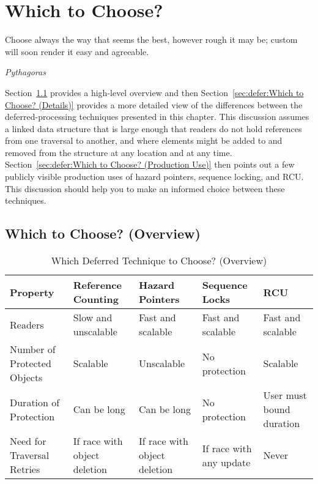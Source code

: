 
\section{Which to Choose?}
\label{sec:defer:Which to Choose?}
%
\epigraph{Choose always the way that seems the best, however rough it
	  may be; custom will soon render it easy and agreeable.}
	  {\emph{Pythagoras}}

Section~\ref{sec:defer:Which to Choose? (Overview)}
provides a high-level overview and then
Section~\ref{sec:defer:Which to Choose? (Details)}
provides a more detailed view
of the differences between the deferred-processing techniques presented
in this chapter.
This discussion assumes a linked data structure that is large enough
that readers do not hold references from one traversal to another,
and where elements might be added to and removed from the structure
at any location and at any time.
Section~\ref{sec:defer:Which to Choose? (Production Use)}
then points out a few publicly visible production uses of
hazard pointers, sequence locking, and RCU\@.
This discussion should help you to make an informed choice between
these techniques.

\subsection{Which to Choose? (Overview)}
\label{sec:defer:Which to Choose? (Overview)}

\begin{table*}
\renewcommand*{\arraystretch}{1.25}
\footnotesize
\centering\OneColumnHSpace{-.3in}
\begin{tabularx}{5.3in}{>{\raggedright\arraybackslash}p{1.1in}
    >{\raggedright\arraybackslash}p{1.0in}
    >{\raggedright\arraybackslash}X
    >{\raggedright\arraybackslash}X
    >{\raggedright\arraybackslash}p{.9in}}
	\toprule
	Property
		& Reference Counting
			& Hazard Pointers
				& Sequence Locks
					& RCU \\
	\midrule
	Readers
		& Slow and unscalable
			& Fast and scalable
				& Fast and scalable
					& Fast and scalable \\
	Number of Protected Objects
		& Scalable
			& Unscalable
				& No protection
					& Scalable \\
	Duration of Protection
		& Can be long
			& Can be long
				& No protection
					& User must bound duration \\
	Need for Traversal Retries
		& If race with object deletion
			& If race with object deletion
				& If race with any update
					& Never \\
	\bottomrule
\end{tabularx}
\caption{Which Deferred Technique to Choose? (Overview)}
\label{tab:defer:Which Deferred Technique to Choose? (Overview)}
\end{table*}

